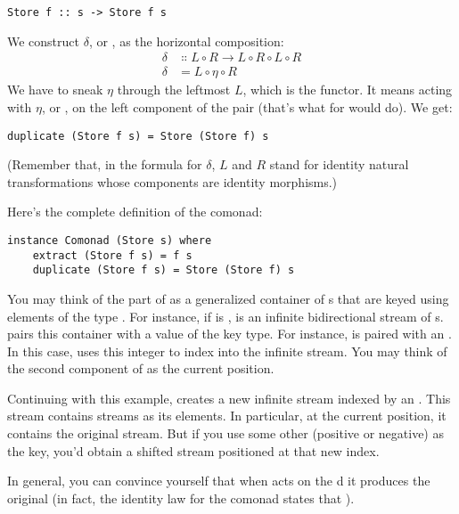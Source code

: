 \begin{Verbatim}
Store f :: s -> Store f s
\end{Verbatim}
We construct $\delta$, or , as the horizontal composition:
\begin{align*}
\delta &\Colon L \circ R \to L \circ R \circ L \circ R \\
\delta &= L \circ \eta \circ R
\end{align*}
We have to sneak $\eta$ through the leftmost $L$, which is the
 functor. It means acting with $\eta$, or , on
the left component of the pair (that's what  for
 would do). We get:

\begin{Verbatim}
duplicate (Store f s) = Store (Store f) s
\end{Verbatim}
(Remember that, in the formula for $\delta$, $L$ and $R$ stand
for identity natural transformations whose components are identity
morphisms.)

Here's the complete definition of the  comonad:

\begin{Verbatim}
instance Comonad (Store s) where
    extract (Store f s) = f s
    duplicate (Store f s) = Store (Store f) s
\end{Verbatim}
You may think of the  part of  as a
generalized container of s that are keyed using elements of
the type . For instance, if  is ,
 is an infinite bidirectional stream of
s.  pairs this container with a value of the key
type. For instance,  is paired with an
. In this case,  uses this integer to index
into the infinite stream. You may think of the second component of
 as the current position.

Continuing with this example,  creates a new infinite
stream indexed by an . This stream contains streams as its
elements. In particular, at the current position, it contains the
original stream. But if you use some other  (positive or
negative) as the key, you'd obtain a shifted stream positioned at that
new index.

In general, you can convince yourself that when  acts on
the d  it produces the original
 (in fact, the identity law for the comonad states that
).

